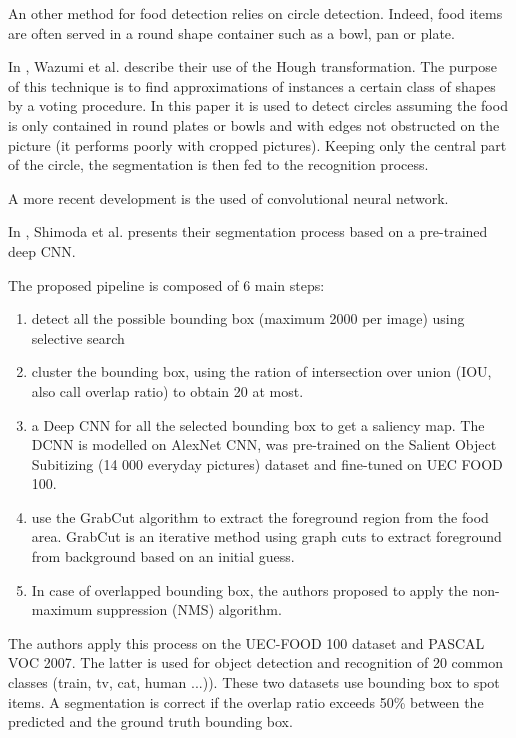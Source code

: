 An other method for food detection relies on circle detection. Indeed, food items are often served in a round shape container such as a bowl, pan or plate.

In \cite{Wazumi2011}, Wazumi et al. describe their use of the Hough transformation. The purpose of this technique is to find approximations of instances a certain class of shapes by a voting procedure. In this paper it is used to detect circles assuming the food is only contained in round plates or bowls and with edges not obstructed on the picture (it performs poorly with cropped pictures). Keeping only the central part of the circle, the segmentation is then fed to the recognition process.


A more recent development is the used of convolutional neural network.

In \cite{Shimoda2015}, Shimoda et al. presents their segmentation process based on a pre-trained deep CNN.

The proposed pipeline is composed of 6 main steps:
\begin{enumerate}
    \item detect all the possible bounding box (maximum 2000 per image) using selective search
    \item cluster the bounding box, using the ration of intersection over union (IOU, also call overlap ratio) to obtain 20 at most.
    \item a Deep CNN for all the selected bounding box to get a saliency map. The DCNN is modelled on AlexNet CNN, was pre-trained on the Salient Object Subitizing (14 000 everyday pictures) dataset and fine-tuned on UEC FOOD 100.
    \item use the GrabCut algorithm to extract the foreground region from the food area. GrabCut is an iterative method using graph cuts to extract foreground from background based on an initial guess.
    \item In case of overlapped bounding box, the authors proposed to apply the non-maximum suppression (NMS) algorithm.
\end{enumerate}

The authors apply this process on the UEC-FOOD 100 dataset and PASCAL VOC 2007. The latter is used for object detection and recognition of 20 common classes (train, tv, cat, human ...)). These two datasets use bounding box to spot items. A segmentation is correct if the overlap ratio exceeds 50\% between the predicted and the ground truth bounding box.

